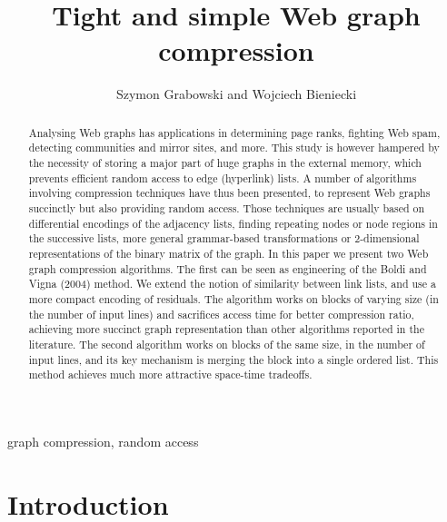 \documentclass[envcountsame]{llncs}
\begin{document}
\title{Tight and simple Web graph compression}


\author{
Szymon Grabowski
and
Wojciech Bieniecki
}


\maketitle


\begin{abstract}
Analysing Web graphs has applications in determining page ranks, 
fighting Web spam, detecting communities and mirror sites, and more.
This study is however hampered by the necessity of storing a major part 
of huge graphs in the external memory, which prevents efficient random 
access to edge (hyperlink) lists.
A number of algorithms involving compression techniques have thus been 
presented, to represent Web graphs succinctly but also providing random 
access.  Those techniques are usually based on differential encodings of 
the adjacency lists, finding repeating nodes or node regions in the 
successive lists, more general grammar-based transformations or 
2-dimensional representations of the binary matrix of the graph.
In this paper we present 
two Web graph compression algorithms. The first can be seen 
as engineering of the Boldi and Vigna (2004) method.
We extend the notion of similarity between link lists, and use a more 
compact encoding of residuals.  The algorithm works on blocks of varying 
size (in the number of input lines) and sacrifices access time for better 
compression ratio, achieving more succinct graph representation than 
other algorithms reported in the literature.
The second algorithm works on blocks of the same size, in the number of 
input lines, and its key mechanism is merging the block into a single ordered 
list. This method achieves much more attractive space-time tradeoffs.
\end{abstract}

\begin{keywords}
graph compression, random access
\end{keywords}

\section{Introduction}
\end{document}
